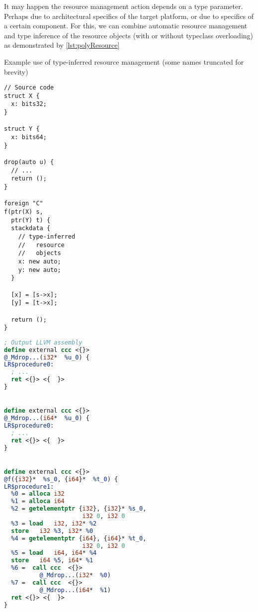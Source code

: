 It may happen the resource management action depends on a type parameter. Perhaps due to architectural specifics of the target platform, or due to specifics of a certain component. For this, we can combine automatic resource management and type inference of the resource objects (with or without typeclass overloading) as demonstrated by \cref{lst:polyResource}

\begin{listing}
    \small
    \caption{Example use of type-inferred resource management (some names truncated for brevity)}
    \label{lst:polyResource}
    \begin{center}
    \begin{minipage}{0.35\linewidth}
    \begin{lstlisting}
// Source code
struct X {
  x: bits32;
}

struct Y {
  x: bits64;
}

drop(auto u) {
  // ...
  return ();
}

foreign "C"
f(ptr(X) s,
  ptr(Y) t) {
  stackdata {
    // type-inferred
    //   resource
    //   objects
    x: new auto;
    y: new auto;
  }

  [x] = [s->x];
  [y] = [t->x];

  return ();
}
    \end{lstlisting}
    \end{minipage}%
    \begin{minipage}{0.65\linewidth}
    \begin{lstlisting}[language=LLVM]
; Output LLVM assembly
define external ccc <{}>
@_Mdrop...(i32*  %u_0) {
LR$procedure0:
  ; ...
  ret <{}> <{  }>
}


define external ccc <{}>
@_Mdrop...(i64*  %u_0) {
LR$procedure0:
  ; ...
  ret <{}> <{  }>
}


define external ccc <{}>
@f({i32}*  %s_0, {i64}*  %t_0) {
LR$procedure1:
  %0 = alloca i32
  %1 = alloca i64
  %2 = getelementptr {i32}, {i32}* %s_0,
                      i32 0, i32 0
  %3 = load   i32, i32* %2
  store   i32 %3, i32* %0
  %4 = getelementptr {i64}, {i64}* %t_0,
                      i32 0, i32 0
  %5 = load   i64, i64* %4
  store   i64 %5, i64* %1
  %6 =  call ccc  <{}>
          @_Mdrop...(i32*  %0)
  %7 =  call ccc  <{}>
          @_Mdrop...(i64*  %1)
  ret <{}> <{  }>
}
    \end{lstlisting}
    \end{minipage}
    \end{center}
\end{listing}

